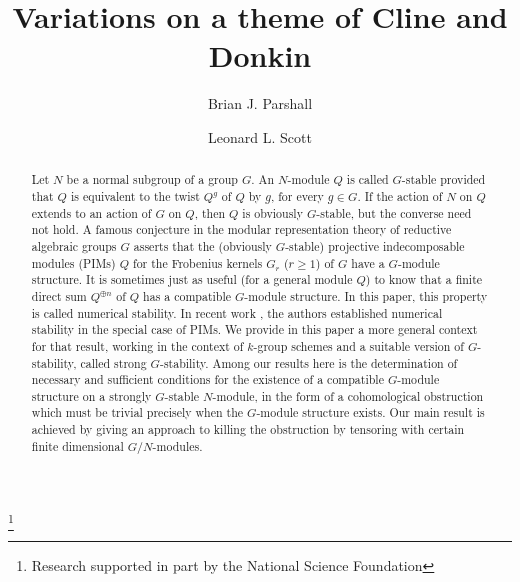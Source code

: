 \documentclass[11pt,leqno,amscd,amssymb,verbatim, url]{amsart}
\theoremstyle{definition}
\numberwithin{equation}{thm}
\begin{document}
\title[Variations on a theme of Cline and Donkin ]{\large {\bf Variations on a theme of Cline and Donkin}}


\author{Brian J. Parshall}
\address{Department of Mathematics \\
University of Virginia\\
Charlottesville, VA 22903} 
\author{Leonard L. Scott}
\address{Department of Mathematics \\
University of Virginia\\
Charlottesville, VA 22903} 
\thanks{Research supported in part by the National Science
Foundation} 
\begin{abstract} Let $N$ be a normal subgroup of a group $G$. An $N$-module $Q$ is called $G$-stable provided that $Q$ is equivalent to the twist $Q^g$ of $Q$ by $g$, for every $g\in G$. If the action of $N$ on $Q$ extends to an action of $G$ on $Q$, then $Q$ is obviously $G$-stable, but the converse need not hold. A famous conjecture in the modular representation theory of reductive algebraic groups $G$ asserts that the (obviously $G$-stable) projective indecomposable modules (PIMs) $Q$ for the Frobenius kernels $G_r$ ($r\geq 1$) of $G$ have a $G$-module structure. It is sometimes just as useful (for a general module $Q$) to know that a finite direct sum $Q^{\oplus n}$ of $Q$ has a compatible $G$-module structure. In this paper, this property is called numerical stability. In recent work \cite{PS}, the authors established numerical stability in the special case of PIMs. We provide in this paper a more general context for that result, working in the context of $k$-group schemes and a suitable version of $G$-stability, called strong $G$-stability.
 Among our results here is the determination of necessary and sufficient conditions for the existence of a compatible $G$-module structure on a strongly $G$-stable $N$-module, in the form of a cohomological obstruction which must be trivial precisely when the $G$-module structure exists. Our main result is achieved by giving an approach to killing the obstruction by tensoring with certain
 finite dimensional $G/N$-modules.


   \end{abstract}
\maketitle
\end{document}
